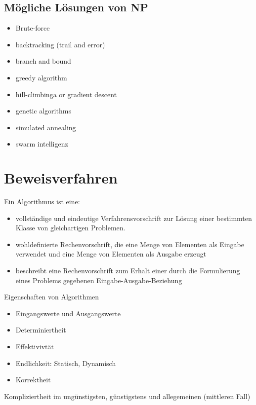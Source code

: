 \documentclass{article}
\begin{document}
\begin{multicols}{2}
\subsection{Mögliche Lösungen von NP}

\begin{itemize}
    \item Brute-force
    \item backtracking (trail and error)
    \item branch and bound
    \item greedy algorithm
    \item hill-climbinga or gradient descent
    \item genetic algorithms
    \item simulated annealing
    \item swarm intelligenz
\end{itemize}


\section{Beweisverfahren}

Ein Algorithmus ist eine:

\begin{itemize}
    \item vollständige und eindeutige Verfahrensvorschrift zur Lösung einer bestimmten Klasse von gleichartigen Problemen.
    \item wohldefinierte Rechenvorschrift, die eine Menge von Elementen als Eingabe verwendet und eine Menge von Elementen als Ausgabe erzeugt
    \item beschreibt eine Rechenvorschrift zum Erhalt einer durch die Formulierung eines Problems gegebenen Eingabe-Ausgabe-Beziehung
\end{itemize}

Eigenschaften von Algorithmen

\begin{itemize}
    \item Eingangswerte und Ausgangswerte
    \item Determiniertheit
    \item Effektivivtät
    \item Endlichkeit: Statisch, Dynamisch
    \item Korrektheit
\end{itemize}

Kompliziertheit im ungünstigsten, günstigstens und allegemeinen (mittleren Fall)



\end{multicols}
\end{document}
